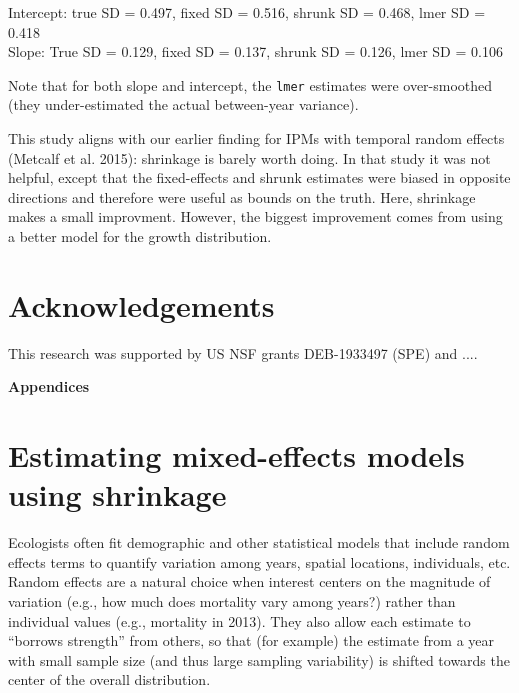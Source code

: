 \documentclass[11pt]{article}
\begin{document}
{\begin{enumerate}
Intercept: true SD =  0.497, fixed SD =  0.516, shrunk SD = 0.468, lmer SD =  0.418 \\
Slope: True SD =  0.129, fixed SD = 0.137, shrunk SD = 0.126,  lmer SD = 0.106
 
Note that for both slope and intercept, the \texttt{lmer} estimates were over-smoothed (they under-estimated the
actual between-year variance). 

This study aligns with our earlier finding for IPMs with temporal random effects (Metcalf et al. 2015): shrinkage is barely worth
doing. In that study it was not helpful, except that the fixed-effects and shrunk estimates were biased in opposite directions and
therefore were useful as bounds on the truth. Here, shrinkage makes a small improvment. However, the biggest improvement comes
from using a better model for the growth distribution.   

\end{enumerate} 


\clearpage 

\section*{Acknowledgements} 
This research was supported by US NSF grants DEB-1933497 (SPE) and .... 

\newpage 

%



\newpage 
\clearpage 
\setcounter{equation}{0}
\setcounter{figure}{0}
\setcounter{section}{0}
\setcounter{table}{0}
\setcounter{Box}{0}
\renewcommand{\theequation}{S.\arabic{equation}}
\renewcommand{\thetable}{S-\arabic{table}}
\renewcommand{\thefigure}{S-\arabic{figure}}
\renewcommand{\theBox}{S-\arabic{Box}}
\renewcommand{\thesection}{S.\arabic{section}}

\centerline{\Large{\textbf{Appendices}}}

\section{Estimating mixed-effects models using shrinkage}

Ecologists often fit demographic and other statistical models that include random effects terms to
quantify variation among years, spatial locations, individuals, etc. Random effects
are a natural choice when interest centers on the magnitude of variation (e.g., how much does mortality vary among years?)  
rather than individual values (e.g., mortality in 2013). They also allow each estimate to 
``borrows strength'' from others, so that (for example) the estimate from a year with small sample size (and thus large 
sampling variability) is shifted towards the center of the overall distribution. 

}
\end{document}
